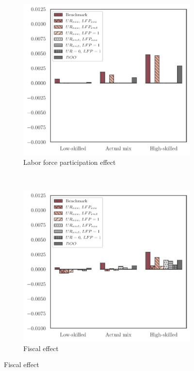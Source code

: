 \documentclass[a4paper,12pt]{article}
\begin{document}
{\begin{landscape}
\begin{center}
\begin{figure}[htb!]
\begin{subfigure}{.3\linewidth}
\end{subfigure}
\hfill
\begin{subfigure}{.3\linewidth}
  \centering
\caption{Labor force participation effect} \label{fig:decomp_mean_ln}
  \includegraphics[width=\linewidth]{graphs/qln.pdf}
\end{subfigure}
\\[0.5cm]
\begin{subfigure}{.3\linewidth}
  \centering
\caption{Fiscal effect} \label{fig:decomp_mean_tau}
  \includegraphics[width=\linewidth]{graphs/qTau.pdf}

\end{subfigure}
\end{figure}
\end{center}
\end{landscape}}
\end{document}
